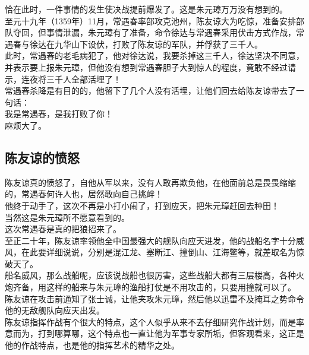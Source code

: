 \begin{multicols}{\theparacolNo}
恰在此时，一件事情的发生使决战提前爆发了。这是朱元璋万万没有想到的。\\

至元十九年（1359年）11月，常遇春率部攻克池州，陈友谅大为吃惊，准备安排部队夺回，但事情泄漏，朱元璋有了准备，命令徐达与常遇春采用伏击方式作战，常遇春与徐达在九华山下设伏，打败了陈友谅的军队，并俘获了三千人。\\

此时，常遇春的老毛病犯了，他对徐达说，我要杀掉这三千人，徐达坚决不同意，并表示要上报朱元璋，但他没有想到常遇春胆子大到惊人的程度，竟敢不经过请示，连夜将三千人全部活埋了！\\

常遇春杀降是有目的的，他留下了几个人没有活埋，让他们回去给陈友谅带去了一句话：\\

我是常遇春，是我打败了你！\\

麻烦大了。\\

\subsection{陈友谅的愤怒}
陈友谅真的愤怒了，自他从军以来，没有人敢再欺负他，在他面前总是畏畏缩缩的，常遇春何许人也，居然敢向自己挑衅！\\

他终于动手了，这次不再是小打小闹了，打到应天，把朱元璋赶回去种田！\\

当然这是朱元璋所不愿意看到的。\\

这次常遇春是真的把狼招来了。\\

至正二十年，陈友谅率领他全中国最强大的舰队向应天进发，他的战船名字十分威风，在此要详细说说，分别是混江龙、塞断江、撞倒山、江海鳖等，就差取名为惊破天了。\\

船名威风，那么战船呢，应该说战船也很厉害，这些战船大都有三层楼高，各种火炮齐备，用这样的船来与朱元璋的渔船打仗是不用攻击的，只要用撞就可以了。\\

陈友谅在攻击前通知了张士诚，让他夹攻朱元璋，然后他以迅雷不及掩耳之势命令他的无敌舰队向应天出发。\\

陈友谅指挥作战有个很大的特点，这个人似乎从来不去仔细研究作战计划，而是率意而为，打到哪算哪，这个特点也一直让他为军事专家所垢，但客观看来，这正是他的作战特点，也是他的指挥艺术的精华之处。\\


\end{multicols}
